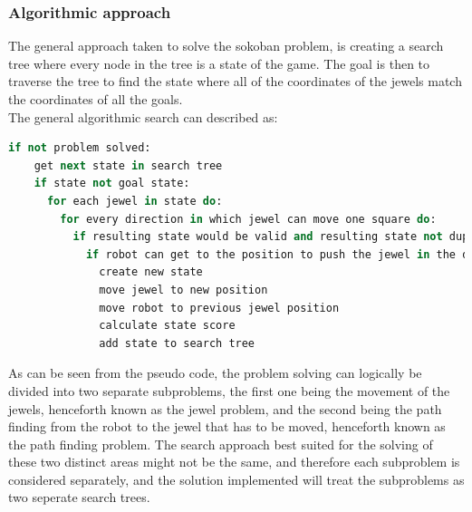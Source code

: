 \subsubsection{Algorithmic approach}
The general approach taken to solve the sokoban problem, is creating a search tree where every node in the tree is a state of the game. The goal is then to traverse the tree to find the state where all of the coordinates of the jewels match the coordinates of all the goals.\\
The general algorithmic search can described as:

\begin{lstlisting}[language=Ruby, frame=single, basicstyle=\tiny, caption={Deadlock detection pseudo code}, label={code:sokoalgo}]
if not problem solved:
	get next state in search tree
	if state not goal state:
	  for each jewel in state do:
	    for every direction in which jewel can move one square do:
		  if resulting state would be valid and resulting state not duplicate of a previous state:
			if robot can get to the position to push the jewel in the desired direction:
			  create new state				
			  move jewel to new position
			  move robot to previous jewel position
			  calculate state score
			  add state to search tree	
\end{lstlisting}

As can be seen from the pseudo code, the problem solving can logically be divided into two separate subproblems, the first one being the movement of the jewels, henceforth known as the jewel problem, and the second being the path finding from the robot to the jewel that has to be moved, henceforth known as the path finding problem. 
The search approach best suited for the solving of these two distinct areas might not be the same, and therefore each subproblem is considered separately, and the solution implemented will treat the subproblems as two seperate search trees. 
